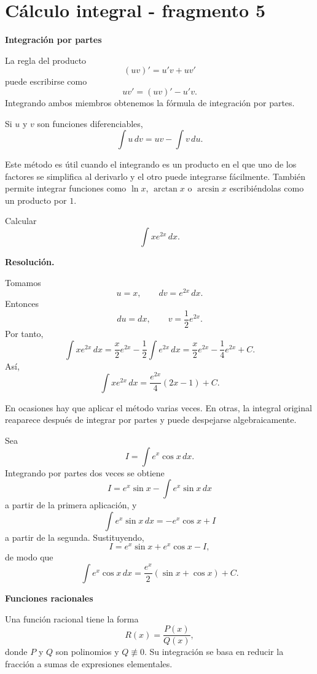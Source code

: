 \section{Cálculo integral - fragmento 5}
\textbf{Integración por partes}

La regla del producto
\[
(uv)'=u'v+uv'
\]
puede escribirse como
\[
u v'= (uv)'-u'v.
\]
Integrando ambos miembros obtenemos la fórmula de integración por partes.

\begin{theorem}
Si $u$ y $v$ son funciones diferenciables,
\[
\boxed{\int u\,dv=uv-\int v\,du.}
\]
\end{theorem}

Este método es útil cuando el integrando es un producto en el que uno de los factores se simplifica al derivarlo y el otro puede integrarse fácilmente. También permite integrar funciones como $\ln x$, $\arctan x$ o $\arcsin x$ escribiéndolas como un producto por $1$.

\begin{solvedexercise}
Calcular
\[
\int x e^{2x}\,dx.
\]

\textbf{Resolución.}\par\smallskip
Tomamos
\[
u=x,
\qquad dv=e^{2x}\,dx.
\]
Entonces
\[
du=dx,
\qquad v=\frac12e^{2x}.
\]
Por tanto,
\[
\int xe^{2x}\,dx
=
\frac{x}{2}e^{2x}-\frac12\int e^{2x}\,dx
=
\frac{x}{2}e^{2x}-\frac14e^{2x}+C.
\]
Así,
\[
\boxed{\int xe^{2x}\,dx=\frac{e^{2x}}4(2x-1)+C.}
\]
\end{solvedexercise}

En ocasiones hay que aplicar el método varias veces. En otras, la integral original reaparece después de integrar por partes y puede despejarse algebraicamente.

\begin{example}
Sea
\[
I=\int e^x\cos x\,dx.
\]
Integrando por partes dos veces se obtiene
\[
I=e^x\sin x-\int e^x\sin x\,dx
\]
a partir de la primera aplicación, y
\[
\int e^x\sin x\,dx=-e^x\cos x+I
\]
a partir de la segunda. Sustituyendo,
\[
I=e^x\sin x+e^x\cos x-I,
\]
de modo que
\[
\boxed{\int e^x\cos x\,dx=\frac{e^x}{2}(\sin x+\cos x)+C.}
\]
\end{example}

\textbf{Funciones racionales}

Una función racional tiene la forma
\[
R(x)=\frac{P(x)}{Q(x)},
\]
donde $P$ y $Q$ son polinomios y $Q\not\equiv0$. Su integración se basa en reducir la fracción a sumas de expresiones elementales.


